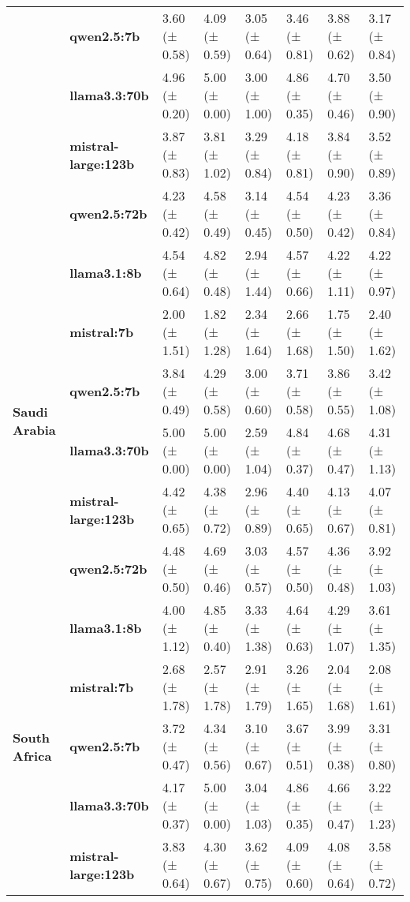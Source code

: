 \begin{longtable}{llllllll}
\textbf{} & \textbf{qwen2.5:7b} & 3.60 (± 0.58) & 4.09 (± 0.59) & 3.05 (± 0.64) & 3.46 (± 0.81) & 3.88 (± 0.62) & 3.17 (± 0.84) \\
\textbf{} & \textbf{llama3.3:70b} & 4.96 (± 0.20) & 5.00 (± 0.00) & 3.00 (± 1.00) & 4.86 (± 0.35) & 4.70 (± 0.46) & 3.50 (± 0.90) \\
\textbf{} & \textbf{mistral-large:123b} & 3.87 (± 0.83) & 3.81 (± 1.02) & 3.29 (± 0.84) & 4.18 (± 0.81) & 3.84 (± 0.90) & 3.52 (± 0.89) \\
\textbf{} & \textbf{qwen2.5:72b} & 4.23 (± 0.42) & 4.58 (± 0.49) & 3.14 (± 0.45) & 4.54 (± 0.50) & 4.23 (± 0.42) & 3.36 (± 0.84) \\
\cline{1-8}
\multirow[t]{6}{*}{\textbf{Saudi Arabia}} & \textbf{llama3.1:8b} & 4.54 (± 0.64) & 4.82 (± 0.48) & 2.94 (± 1.44) & 4.57 (± 0.66) & 4.22 (± 1.11) & 4.22 (± 0.97) \\
\textbf{} & \textbf{mistral:7b} & 2.00 (± 1.51) & 1.82 (± 1.28) & 2.34 (± 1.64) & 2.66 (± 1.68) & 1.75 (± 1.50) & 2.40 (± 1.62) \\
\textbf{} & \textbf{qwen2.5:7b} & 3.84 (± 0.49) & 4.29 (± 0.58) & 3.00 (± 0.60) & 3.71 (± 0.58) & 3.86 (± 0.55) & 3.42 (± 1.08) \\
\textbf{} & \textbf{llama3.3:70b} & 5.00 (± 0.00) & 5.00 (± 0.00) & 2.59 (± 1.04) & 4.84 (± 0.37) & 4.68 (± 0.47) & 4.31 (± 1.13) \\
\textbf{} & \textbf{mistral-large:123b} & 4.42 (± 0.65) & 4.38 (± 0.72) & 2.96 (± 0.89) & 4.40 (± 0.65) & 4.13 (± 0.67) & 4.07 (± 0.81) \\
\textbf{} & \textbf{qwen2.5:72b} & 4.48 (± 0.50) & 4.69 (± 0.46) & 3.03 (± 0.57) & 4.57 (± 0.50) & 4.36 (± 0.48) & 3.92 (± 1.03) \\
\cline{1-8}
\multirow[t]{6}{*}{\textbf{South Africa}} & \textbf{llama3.1:8b} & 4.00 (± 1.12) & 4.85 (± 0.40) & 3.33 (± 1.38) & 4.64 (± 0.63) & 4.29 (± 1.07) & 3.61 (± 1.35) \\
\textbf{} & \textbf{mistral:7b} & 2.68 (± 1.78) & 2.57 (± 1.78) & 2.91 (± 1.79) & 3.26 (± 1.65) & 2.04 (± 1.68) & 2.08 (± 1.61) \\
\textbf{} & \textbf{qwen2.5:7b} & 3.72 (± 0.47) & 4.34 (± 0.56) & 3.10 (± 0.67) & 3.67 (± 0.51) & 3.99 (± 0.38) & 3.31 (± 0.80) \\
\textbf{} & \textbf{llama3.3:70b} & 4.17 (± 0.37) & 5.00 (± 0.00) & 3.04 (± 1.03) & 4.86 (± 0.35) & 4.66 (± 0.47) & 3.22 (± 1.23) \\
\textbf{} & \textbf{mistral-large:123b} & 3.83 (± 0.64) & 4.30 (± 0.67) & 3.62 (± 0.75) & 4.09 (± 0.60) & 4.08 (± 0.64) & 3.58 (± 0.72) \\

\end{longtable}
